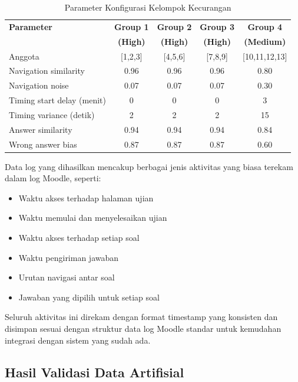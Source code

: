 \begin{table}[htbp]
\centering
\caption{Parameter Konfigurasi Kelompok Kecurangan}
\label{tabel:parameterKelompok}
\begin{tabular}{|p{3.5cm}|c|c|c|c|}
\hline
\textbf{Parameter} & \textbf{Group 1} & \textbf{Group 2} & \textbf{Group 3} & \textbf{Group 4} \\
\textbf{} & \textbf{(High)} & \textbf{(High)} & \textbf{(High)} & \textbf{(Medium)} \\
\hline
Anggota & [1,2,3] & [4,5,6] & [7,8,9] & [10,11,12,13] \\
\hline
Navigation similarity & 0.96 & 0.96 & 0.96 & 0.80 \\
\hline
Navigation noise & 0.07 & 0.07 & 0.07 & 0.30 \\
\hline
Timing start delay (menit) & 0 & 0 & 0 & 3 \\
\hline
Timing variance (detik) & 2 & 2 & 2 & 15 \\
\hline
Answer similarity & 0.94 & 0.94 & 0.94 & 0.84 \\
\hline
Wrong answer bias & 0.87 & 0.87 & 0.87 & 0.60 \\
\hline
\end{tabular}
\end{table}

Data log yang dihasilkan mencakup berbagai jenis aktivitas yang biasa terekam dalam log Moodle, seperti:
\begin{itemize}
    \item Waktu akses terhadap halaman ujian
    \item Waktu memulai dan menyelesaikan ujian
    \item Waktu akses terhadap setiap soal
    \item Waktu pengiriman jawaban
    \item Urutan navigasi antar soal
    \item Jawaban yang dipilih untuk setiap soal
\end{itemize}

Seluruh aktivitas ini direkam dengan format timestamp yang konsisten dan disimpan sesuai dengan struktur data log Moodle standar untuk kemudahan integrasi dengan sistem yang sudah ada.

\subsection{Hasil Validasi Data Artifisial}
\label{subsec:hasilValidasiDataArtifisial}

